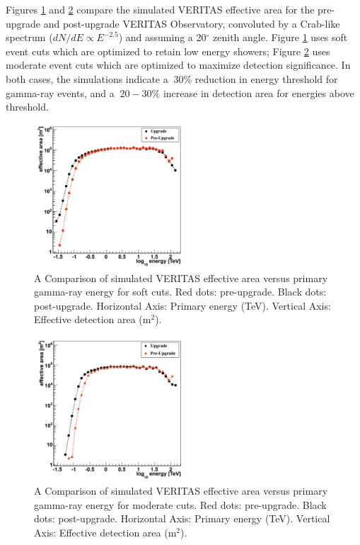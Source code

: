 \documentclass[a4paper]{article}
\begin{document}
Figures \ref{DetectAreaSoft}  and \ref{DetectAreaMedium} compare the simulated VERITAS effective area for the pre-upgrade and post-upgrade VERITAS Observatory, convoluted by  a Crab-like spectrum ($dN/dE \propto E^{-2.5}$) and assuming a 20$^\circ$ zenith angle. Figure \ref{DetectAreaSoft} uses soft event cuts which are optimized to retain low energy showers;   Figure \ref{DetectAreaMedium} uses moderate event cuts which are optimized to maximize detection significance.  In both cases, the simulations indicate a $~30$\% reduction in energy threshold for gamma-ray events, and a $~20-30\%$ increase in detection area for energies above threshold.
 
\begin{figure}[t]
  \centering
  \includegraphics[width=0.5\textwidth]{icrc2013-04}
  \caption{ A Comparison of simulated VERITAS effective area versus primary gamma-ray energy for soft cuts. Red dots: pre-upgrade. Black dots: post-upgrade. Horizontal Axis: Primary energy (TeV). Vertical Axis:  Effective detection area (m$^2$). }
  \label{DetectAreaSoft}
 \end{figure}

\begin{figure}[t]
  \centering
  \includegraphics[width=0.5\textwidth]{icrc2013-05}
  \caption{A Comparison of simulated VERITAS effective area versus primary gamma-ray energy for moderate cuts. Red dots: pre-upgrade. Black dots: post-upgrade. Horizontal Axis: Primary energy (TeV). Vertical Axis:  Effective detection area (m$^2$).}
  \label{DetectAreaMedium}
 \end{figure}
\end{document}
